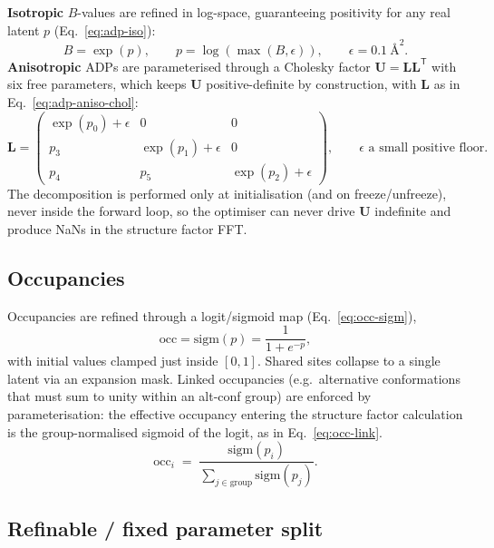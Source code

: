 \documentclass{iucrjournals}
\begin{document}
\textbf{Isotropic} $B$-values are refined in log-space, guaranteeing positivity
for any real latent $p$ (Eq.~\ref{eq:adp-iso}):
%
\begin{equation}
  B = \exp(p), \qquad p = \log(\max(B,\epsilon)),
  \qquad \epsilon = 0.1~\text{\AA}^{2}.
  \label{eq:adp-iso}
\end{equation}
%
\textbf{Anisotropic} ADPs are parameterised through a Cholesky factor
$\mathbf{U} = \mathbf{L}\mathbf{L}^{\mathsf{T}}$ with six free parameters, which
keeps $\mathbf{U}$ positive-definite by construction, with $\mathbf{L}$ as in
Eq.~\ref{eq:adp-aniso-chol}:
%
\begin{equation}
  \mathbf{L} =
  \begin{pmatrix}
    \exp(p_{0}) + \epsilon & 0 & 0 \\
    p_{3} & \exp(p_{1}) + \epsilon & 0 \\
    p_{4} & p_{5} & \exp(p_{2}) + \epsilon
  \end{pmatrix},
  \qquad \epsilon \text{ a small positive floor}.
  \label{eq:adp-aniso-chol}
\end{equation}
%
The decomposition is performed only at initialisation (and on freeze/unfreeze),
never inside the forward loop, so the optimiser can never drive $\mathbf{U}$
indefinite and produce NaNs in the structure factor FFT.

\subsection{Occupancies}

Occupancies are refined through a logit/sigmoid map (Eq.~\ref{eq:occ-sigm}),
%
\begin{equation}
  \mathrm{occ} = \mathrm{sigm}(p) = \frac{1}{1 + e^{-p}},
  \label{eq:occ-sigm}
\end{equation}
%
with initial values clamped just inside $[0,1]$.
Shared sites collapse to a single latent via an expansion mask.
Linked occupancies (e.g.\ alternative conformations that must sum to unity
within an alt-conf group) are enforced by parameterisation: the effective
occupancy entering the structure factor calculation is the group-normalised
sigmoid of the logit, as in Eq.~\ref{eq:occ-link}.
%
\begin{equation}
  \mathrm{occ}_{i} \;=\;
  \frac{\mathrm{sigm}(p_{i})}{\sum_{j \in \mathrm{group}} \mathrm{sigm}(p_{j})}.
  \label{eq:occ-link}
\end{equation}


\subsection{Refinable / fixed parameter split}
\end{document}
